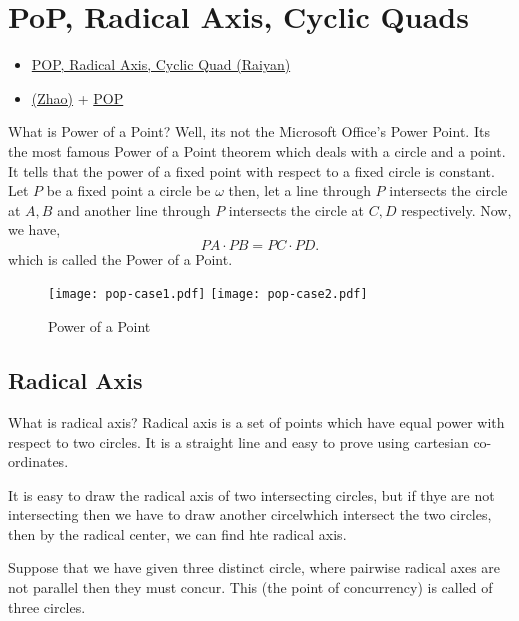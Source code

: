 \chapter{PoP, Radical Axis, Cyclic Quads}%

\begin{linkb}
   \begin{itemize}
        \item \href{https://www.youtube.com/watch?v=iEilRQH6uL0}{POP, Radical Axis, Cyclic Quad (Raiyan)}
        \item \href{https://drive.google.com/file/d/1PlsMrV70QsknXCm5qDsRG5RIhLID_6rL/view}{(Zhao)} + \href{https://drive.google.com/file/d/1I53hLdluSuuN7O7Cuu4teubpSaxvwImZ/view}{POP} 
   \end{itemize}
\end{linkb}

What is Power of a Point? Well, its not the Microsoft Office's Power Point.  Its the most famous Power of a Point theorem which deals with a circle and a point. It tells that the power of a fixed point with respect to a fixed circle is constant. Let $P$ be a fixed point a circle be $\omega$ then,  let a line through $P$ intersects the circle at $A,B$ and another line through $P$ intersects the circle at $C,D$ respectively. Now, we have, 
\[ PA\cdot PB = PC \cdot PD.\]
which is called the Power of a Point.

\begin{figure}[ht]
\centering
		\texttt{[image: pop-case1.pdf]}
	\qquad
		\texttt{[image: pop-case2.pdf]}
	\caption{Power of a Point}
\end{figure}


\section{Radical Axis}
What is radical axis? Radical axis is a set of points which have equal power with respect to two circles. It is a straight line and easy to prove using cartesian co-ordinates.

It is easy to draw the radical axis of two intersecting circles, but if thye are not intersecting then we have to draw another circelwhich intersect the two circles, then by the radical center, we can find hte radical axis.


Suppose that we have given three distinct circle, where pairwise radical axes are not parallel then they must concur. This (the point of concurrency) is called  of three circles.


